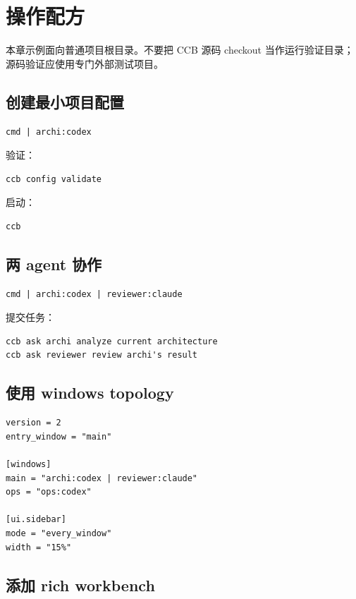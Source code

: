 \chapter{操作配方}

本章示例面向普通项目根目录。不要把 CCB 源码 checkout  当作运行验证目录；源码验证应使用专门外部测试项目。

\section{创建最小项目配置}

\begin{lstlisting}
cmd | archi:codex
\end{lstlisting}

验证：

\begin{lstlisting}
ccb config validate
\end{lstlisting}

启动：

\begin{lstlisting}
ccb
\end{lstlisting}

\section{两 agent 协作}

\begin{lstlisting}
cmd | archi:codex | reviewer:claude
\end{lstlisting}

提交任务：

\begin{lstlisting}
ccb ask archi analyze current architecture
ccb ask reviewer review archi's result
\end{lstlisting}

\section{使用 windows topology}

\begin{lstlisting}
version = 2
entry_window = "main"

[windows]
main = "archi:codex | reviewer:claude"
ops = "ops:codex"

[ui.sidebar]
mode = "every_window"
width = "15%"
\end{lstlisting}

\section{添加 rich workbench}

